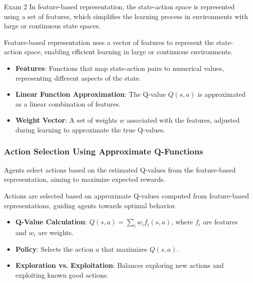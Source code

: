 \begin{examnotes}{Exam 2}
    In feature-based representation, the state-action space is represented using a set of features, which simplifies the learning process in environments with large or continuous state spaces.
    
    \begin{highlight}
        Feature-based representation uses a vector of features to represent the state-action space, enabling efficient learning in large or continuous environments.
        
        \begin{itemize}
            \item \textbf{Features}: Functions that map state-action pairs to numerical values, representing different aspects of the state.
            \item \textbf{Linear Function Approximation}: The Q-value $Q(s, a)$ is approximated as a linear combination of features.
            \item \textbf{Weight Vector}: A set of weights $w$ associated with the features, adjusted during learning to approximate the true Q-values.
        \end{itemize}
    \end{highlight}
    
    \subsubsection*{Action Selection Using Approximate Q-Functions}
    
    Agents select actions based on the estimated Q-values from the feature-based representation, aiming to maximize expected rewards.
    
    \begin{highlight}
        Actions are selected based on approximate Q-values computed from feature-based representations, guiding agents towards optimal behavior.
        
        \begin{itemize}
            \item \textbf{Q-Value Calculation}: $Q(s, a) = \sum_i w_i f_i(s, a)$, where $f_i$ are features and $w_i$ are weights.
            \item \textbf{Policy}: Selects the action $a$ that maximizes $Q(s, a)$.
            \item \textbf{Exploration vs. Exploitation}: Balances exploring new actions and exploiting known good actions.
        \end{itemize}
    \end{highlight}
    

\end{examnotes}
